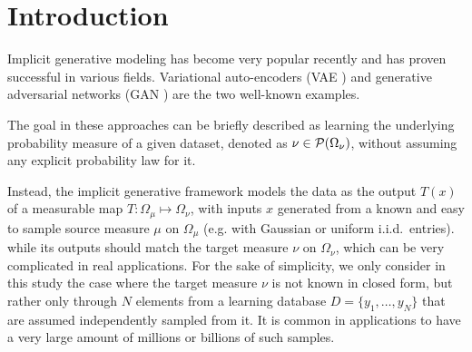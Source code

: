 
\section{Introduction}




Implicit generative modeling \cite{diggle1984monte, mohamed2016learning} has become very popular recently and has proven successful in various fields. Variational auto-encoders (VAE \cite{kingma2013VAE}) and generative adversarial networks (GAN \cite{goodfellow2014generative}) are the two well-known examples.

The goal in these approaches can be briefly described as learning the underlying probability measure of a given dataset, denoted as $\nu \in {\cal P}(\Omega_\nu)$, without assuming any explicit probability law for it.

Instead, the implicit generative framework models the data as the output $T(x)$ of a measurable map $T: \Omega_\mu \mapsto \Omega_\nu$, with inputs $x$ generated from a known and easy to sample source measure $\mu$ on $\Omega_\mu$ (e.g. with Gaussian or uniform i.i.d.\ entries). while its outputs should match the target measure $\nu$ on $\Omega_\nu$, which can be very complicated in real applications.
For the sake of simplicity, we only consider in this study the case where the target measure $\nu$ is not known in closed form, but rather only through $N$ elements from a learning database $D = \{y_1 , \dots , y_N \}$ that are assumed independently sampled from it. It is common in applications to have a very large amount of millions or billions of such samples.


